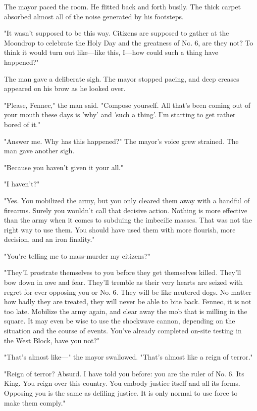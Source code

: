 The mayor paced the room. He flitted back and forth busily. The thick
carpet absorbed almost all of the noise generated by his footsteps.

"It wasn't supposed to be this way. Citizens are supposed to gather at
the Moondrop to celebrate the Holy Day and the greatness of No. 6, are
they not? To think it would turn out like---like this, I---how could such a
thing have happened?"

The man gave a deliberate sigh. The mayor stopped pacing, and deep
creases appeared on his brow as he looked over.

"Please, Fennec," the man said. "Compose yourself. All that's been
coming out of your mouth these days is 'why' and 'such a thing'. I'm
starting to get rather bored of it."

"Answer me. Why has this happened?" The mayor's voice grew strained. The
man gave another sigh.

"Because you haven't given it your all."

"I haven't?"

"Yes. You mobilized the army, but you only cleared them away with a
handful of firearms. Surely you wouldn't call that decisive action.
Nothing is more effective than the army when it comes to subduing the
imbecilic masses. That was not the right way to use them. You should
have used them with more flourish, more decision, and an iron finality."

"You're telling me to mass-murder my citizens?"

"They'll prostrate themselves to you before they get themselves killed.
They'll bow down in awe and fear. They'll tremble as their very hearts
are seized with regret for ever opposing you or No. 6. They will be like
neutered dogs. No matter how badly they are treated, they will never be
able to bite back. Fennec, it is not too late. Mobilize the army again,
and clear away the mob that is milling in the square. It may even be
wise to use the shockwave cannon, depending on the situation and the
course of events. You've already completed on-site testing in the West
Block, have you not?"

"That's almost like---" the mayor swallowed. "That's almost like a reign
of terror."

"Reign of terror? Absurd. I have told you before: you are the ruler of
No. 6. Its King. You reign over this country. You embody justice itself
and all its forms. Opposing you is the same as defiling justice. It is
only normal to use force to make them comply."

